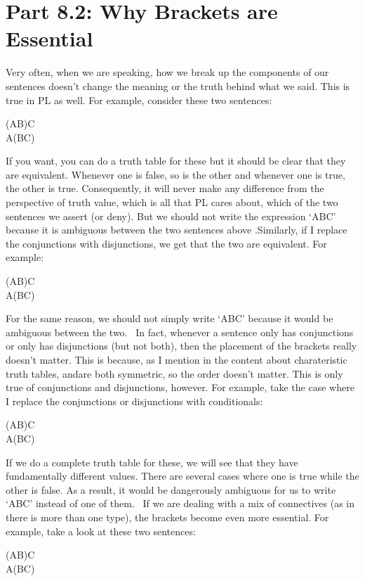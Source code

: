 \section{Part 8.2: Why Brackets are Essential}
Very often, when we are speaking, how we break up the components of our sentences doesn't change the meaning or the truth behind what we said. This is true in PL as well. For example, consider these two sentences:
\begin{center}
(A\eand B)\eand C\\
A\eand (B\eand C)
\end{center}
If you want, you can do a truth table for these but it should be clear that they are \gls{equivalent}. Whenever one is false, so is the other and whenever one is true, the other is true. Consequently, it will never make any difference from the perspective of truth value, which is all that PL cares about, which of the two sentences we assert (or deny). But we should not write the expression `A\eand B\eand C' because it is ambiguous between the two sentences above .Similarly, if I replace the conjunctions with disjunctions, we get that the two are equivalent. For example:
\begin{center}
(A\eor B)\eor C\\
A\eor (B\eor C)
\end{center}
For the same reason, we should not simply write `A\eor B\eor C' because it would be ambiguous between the two.  In fact, whenever a sentence only has conjunctions or only has disjunctions (but not both), then the placement of the brackets really doesn't matter. This is because, as I mention in the content about charateristic truth tables, \eor  and\eand  are both symmetric, so the order doesn't matter. This is only true of conjunctions and disjunctions, however. For example, take the case where I replace the conjunctions or disjunctions with conditionals:
\begin{center}
(A\eif B)\eif C\\
A\eif (B\eif C)
\end{center}
If we do a complete truth table for these, we will see that they have fundamentally different values. There are several cases where one is true while the other is false. As a result, it would be dangerously ambiguous for us to write `A\eif B\eif C' instead of one of them.  If we are dealing with a mix of connectives (as in there is more than one type), the brackets become even more essential. For example, take a look at these two sentences:
\begin{center}
(A\eor B)\eand C\\
A\eor (B\eand C)
\end{center}
